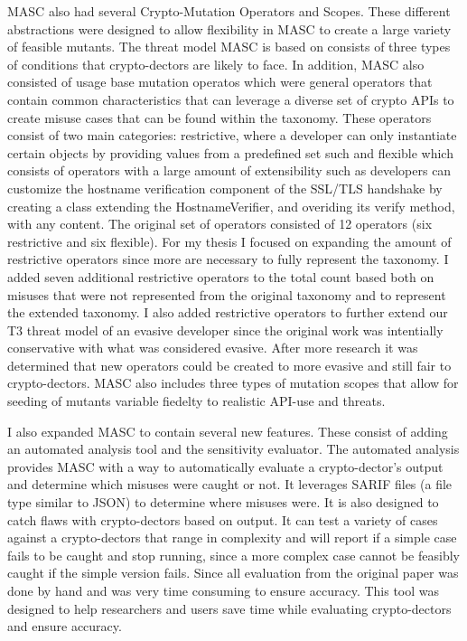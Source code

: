 MASC also had several Crypto-Mutation Operators and Scopes. These different abstractions were designed to allow flexibility in MASC to create a large variety of feasible mutants. The threat model MASC is based on consists of three types of conditions that crypto-dectors are likely to face. In addition, MASC also consisted of usage base mutation operatos which were general operators that contain common characteristics that can leverage a diverse set of crypto APIs to create misuse cases that can be found within the taxonomy. These operators consist of two main categories: restrictive, where a developer can only instantiate certain objects by providing values from a predefined set such  and flexible which consists of operators with a large amount of extensibility such as developers can customize the hostname verification component of the SSL/TLS handshake by creating a class extending the HostnameVerifier, and overiding its verify method, with any content. The original set of operators consisted of 12 operators (six restrictive and six flexible). For my thesis I focused on expanding the amount of restrictive operators since more are necessary to fully represent the taxonomy. I added seven  additional restrictive operators to the total count based both on misuses that were not represented from the original taxonomy and to represent the extended taxonomy. I also added restrictive operators to further extend our T3 threat model of an evasive developer since the original work was intentially conservative with what was considered evasive. After more research it was determined that new operators could be created to more evasive and still fair to crypto-dectors. MASC also includes three types of mutation scopes that allow for seeding of mutants variable fiedelty to realistic API-use and threats.

I also expanded MASC to contain several new features. These consist of adding an automated analysis tool and the sensitivity evaluator. The automated analysis provides MASC with a way to automatically evaluate a crypto-dector's output and determine which misuses were caught or not. It leverages SARIF files (a file type similar to JSON) to determine where misuses were. It is also designed to catch flaws with crypto-dectors based on output. It can test a variety of cases against a crypto-dectors that range in complexity and will report if a simple case fails to be caught and stop running, since a more complex case cannot be feasibly caught if the simple version fails. Since all evaluation from the original paper was done by hand and was very time consuming to ensure accuracy. This tool was designed to help researchers and users save time while evaluating crypto-dectors and ensure accuracy.

